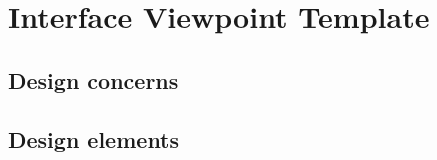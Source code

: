 \chapter{Interface Viewpoint Template} \label{chp:interface-viewpoint-template}
	\begin{comment}
		The Interface viewpoint provides information designers, programmers, and testers the means to know how
		to correctly use the services provided by a design subject. This description includes the details of external
		and internal interfaces not provided in the SRS. This viewpoint consists of a set of interface specifications
		for each entity.
		NOTE—User interfaces are addressed separately.
	\end{comment}
	
	\section{Design concerns} \label{s:interface-viewpoint-template:design-concerns}
		\begin{comment}
			An Interface view description serves as a binding contract among designers, programmers, customers, and
			testers. It provides them with an agreement needed before proceeding with the detailed design of entities.
			The interface description is used by technical writers to produce customer documentation or may be used
			directly by customers. In the latter case, the interface description could result in the production of a human
			interface view.
			
			Designers, programmers, and testers often use design entities that they did not develop. These entities can
			be reused from earlier projects, contracted from an external source, or produced by other developers. The
			interface description establishes an agreement among designers, programmers, and testers about how
			cooperating entities will interact. Each entity interface description should contain everything another
			designer or programmer needs to know to develop software that interacts with that entity. A clear
			description of entity interfaces is essential on a multi-person development for smooth integration and ease
			of maintenance.
		\end{comment}
	
	\section{Design elements} \label{s:interface-viewpoint-template:design-elements}
		\begin{comment}
			The attributes for identification (4.6.2.1), function (5.3.2.1), and interface (5.8.2.1) should be provided for
			all design entities.
		\end{comment}
	
